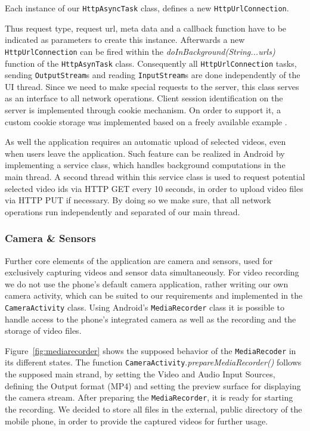 \documentclass[conference]{IEEEtran}
\begin{document}
Each instance of our \texttt{HttpAsyncTask} class, defines a new \texttt{HttpUrlConnection}.

Thus request type, request url, meta data and a callback function have to be indicated as parameters to create this instance.
Afterwards a new \texttt{HttpUrlConnection} can be fired within the \textsl{doInBackground(String...urls)} function of the \texttt{HttpAsynTask} class. Consequently all \texttt{HttpUrlConnection} tasks,
sending \texttt{OutputStream}s and reading \texttt{InputStream}s are done independently of the UI thread.
Since we need to make special requests to the server, this class serves as an interface to all network operations.
Client session identification on the server is implemented through cookie mechanism. 
On order to support it, a custom cookie storage was implemented based on a freely available example \cite{so_java_cookies}.

As well the application requires an automatic upload of selected videos, even when users leave the application.
Such feature can be realized in Android by implementing a service class, which handles background computations in the main thread. 
A second thread within this service class is used to request potential selected video ids via HTTP GET every 10 seconds,
in order to upload video files via HTTP PUT if necessary.
By doing so we make sure, that all network operations run independently and separated of our main thread.

\subsubsection{Camera \& Sensors}
Further core elements of the application are camera and sensors, used for exclusively capturing videos and sensor data simultaneously.
For video recording we do not use the phone's default camera application,
rather writing our own camera activity, which can be suited to our requirements and implemented in the \texttt{CameraActivity} class.
Using Android's \texttt{MediaRecorder} class it is possible to handle access to the phone's integrated camera
as well as the recording and the storage of video files.

Figure~\ref{fig:mediarecorder} \cite{mediarec_doc} shows the supposed behavior of the \texttt{MediaRecoder} in its different states. 
The function \texttt{CameraActivity}.\textsl{prepareMediaRecorder()} follows the supposed main strand,
by setting the Video and Audio Input Sources, defining the Output format (MP4) and setting the preview surface for displaying the camera stream.
After preparing the \texttt{MediaRecorder}, it is ready for starting the recording.
We decided to store all files in the external, public directory of the mobile phone, in order to provide the captured videos for further usage.
\end{document}
